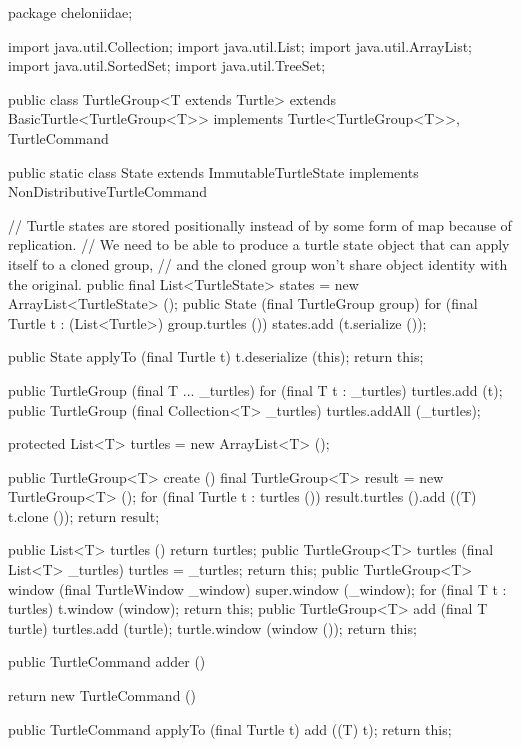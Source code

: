 \documentclass{report}
\begin{document}
\begin{javacode}
package cheloniidae;

import java.util.Collection;
import java.util.List;
import java.util.ArrayList;
import java.util.SortedSet;
import java.util.TreeSet;

public class TurtleGroup<T extends Turtle>
     extends BasicTurtle<TurtleGroup<T>>
  implements Turtle<TurtleGroup<T>>, TurtleCommand {

  public static class State extends ImmutableTurtleState implements NonDistributiveTurtleCommand {
    // Turtle states are stored positionally instead of by some form of map because of replication.
    // We need to be able to produce a turtle state object that can apply itself to a cloned group,
    // and the cloned group won't share object identity with the original.
    public final List<TurtleState> states = new ArrayList<TurtleState> ();
    public State (final TurtleGroup group) {
      for (final Turtle t : (List<Turtle>) group.turtles ()) states.add (t.serialize ());
    }

    public State applyTo (final Turtle t) {
      t.deserialize (this);
      return this;
    }
  }

  public TurtleGroup (final T ...         _turtles) {for (final T t : _turtles) turtles.add (t);}
  public TurtleGroup (final Collection<T> _turtles) {turtles.addAll (_turtles);}

  protected List<T> turtles = new ArrayList<T> ();

  public TurtleGroup<T> create () {
    final TurtleGroup<T> result = new TurtleGroup<T> ();
    for (final Turtle t : turtles ()) result.turtles ().add ((T) t.clone ());
    return result;
  }

  public List<T>        turtles ()                           {return turtles;}
  public TurtleGroup<T> turtles (final List<T> _turtles)     {turtles = _turtles; return this;}
  public TurtleGroup<T> window  (final TurtleWindow _window) {super.window (_window);
                                                              for (final T t : turtles) t.window (window);
                                                              return this;}
  public TurtleGroup<T> add (final T turtle) {
    turtles.add (turtle);
    turtle.window (window ());
    return this;
  }

  public TurtleCommand adder () {
    return new TurtleCommand () {
      public TurtleCommand applyTo (final Turtle t) {
        add ((T) t);
        return this;
      }

}}}
\end{javacode}
\end{document}
